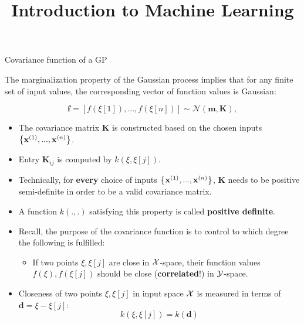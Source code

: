 \documentclass[11pt,compress,t,notes=noshow, xcolor=table]{beamer}
\title{Introduction to Machine Learning}
\date{}
\begin{document}

\begin{vbframe}{Covariance function of a GP}

  The marginalization property of the Gaussian process implies that for any finite set of input values, the corresponding vector of function values is Gaussian:

  $$
    \bm{f} = \left[f\left(\xi[1]\right), ..., f\left(\xi[n]\right)\right] \sim \mathcal{N}\left(\bm{m}, \bm{K}\right),
  $$ 


\begin{itemize}
  \item The covariance matrix $\bm{K}$ is constructed based on the chosen inputs $\left\{\mathbf{x}^{(1)}, ..., \mathbf{x}^{(n)}\right\}$.
  \item Entry $\bm{K}_{ij}$ is computed by $k\left(\xi, \xi[j]\right)$.
  \item Technically, for \textbf{every} choice of inputs $\left\{\mathbf{x}^{(1)}, ..., \mathbf{x}^{(n)}\right\}$, $\bm{K}$ needs to be positive semi-definite in order to be a valid covariance matrix.
  \item A function $k(.,.)$ satisfying this property is called \textbf{positive definite}.

\framebreak 

  \item Recall, the purpose of the covariance function is to control to which degree the following is fulfilled: \vspace*{0.4cm}
  \begin{itemize}
    \item[] If two points $\xi, \xi[j]$ are close in $\mathcal{X}$-space, their function values $f(\xi), f(\xi[j])$ should be close (\textbf{correlated}!) in $\mathcal{Y}$-space.
  \end{itemize} \vspace*{0.4cm}

  \item Closeness of two points $\xi, \xi[j]$ in input space $\mathcal{X}$ is measured in terms of $\bm{d} = \xi - \xi[j]$: 
  $$
    k(\xi, \xi[j]) = k(\bm{d})
  $$ 
\end{itemize}


\end{vbframe}
\end{document}
